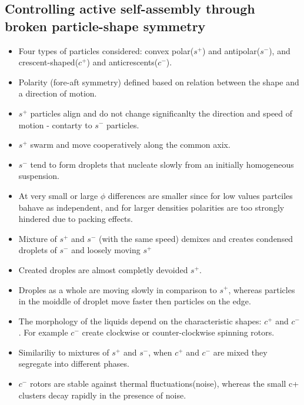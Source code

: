 \documentclass[10pt,a4paper]{article}
\begin{document}
 \subsection{Controlling active self-assembly through broken particle-shape symmetry \cite{dunk:14}} 
 \begin{itemize}
  \item Four types of particles considered: convex polar($s^+$) and antipolar($s^-$), and crescent-shaped($c^+$) and anticrescents($c^-$). 
  \item Polarity (fore-aft symmetry) defined based on relation between the shape and a direction of motion.
  \item $s^+$ particles align and do not change significanlty the direction and speed of motion - contarty to $s^-$ particles. 
  \item $s^+$ swarm and move cooperatively along the common axix.
  \item $s^-$ tend to form droplets that nucleate slowly from an initially homogeneous suspension.
  \item At very small or large $\phi$ differences are smaller since for low values partciles bahave as independent, and for larger
  densities polarities are too strongly hindered due to packing effects.
  \item Mixture of $s^+$ and $s^-$ (with the same speed) demixes and creates condensed droplets of $s^-$ and loosely moving $s^+$
  \item Created droples are almost completly devoided $s^+$.
  \item Droples as a whole are moving slowly in comparison to $s^+$, whereas particles in the moiddle of droplet move faster then particles on the edge.
  \item The morphology of the liquids depend on the characteristic shapes: $c^+$ and $c^-$. 
  For example $c^-$ create clockwise or counter-clockwise spinning rotors.
  \item Similariliy to mixtures of $s^+$ and $s^-$, when $c^+$ and $c^-$ are mixed they segregate into different phases. 
  \item $c^-$ rotors are stable against thermal fluctuations(noise), whereas the small c+ clusters decay rapidly in the presence of noise.
  
  
  
 \end{itemize}


\thispagestyle{empty} %




\clearpage
\end{document}
